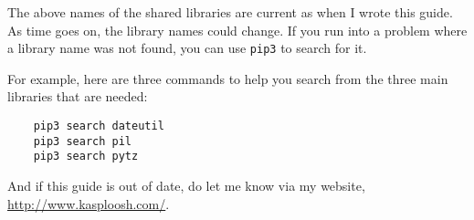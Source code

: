The above names of the shared libraries are current as when I wrote
this guide. As time goes on, the library names could change. If
you run into a problem where a library name was not found, you
can use \verb=pip3= to search for it.

For example, here are three commands to help you search from the
three main libraries that are needed:

\begin{verbatim}
    pip3 search dateutil
    pip3 search pil
    pip3 search pytz
\end{verbatim}

And if this guide is out of date, do let me know via my website,
\url{http://www.kasploosh.com/}.
